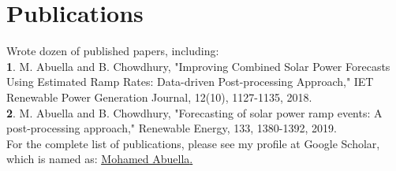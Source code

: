 \documentclass[11pt,letterpaper,sans]{moderncv}
\begin{document}
\section{Publications}
Wrote dozen of published papers, including:\\
\textbf{1}. M. Abuella and B. Chowdhury, "Improving Combined Solar Power Forecasts Using Estimated Ramp Rates: Data-driven Post-processing Approach," IET Renewable Power Generation Journal, 12(10), 1127-1135, 2018.\\
\textbf{2}. M. Abuella and B. Chowdhury, "Forecasting of solar power ramp events: A post-processing approach," Renewable Energy, 133, 1380-1392, 2019.\\
For the complete list of publications, please see my profile at Google Scholar, which is named as:
\href{https://scholar.google.com/citations?user=nJbFUkcAAAAJ&hl=en}{\underline{\textcolor[rgb]{0.00,0.07,1.00}{Mohamed Abuella}}.}



\end{document}
